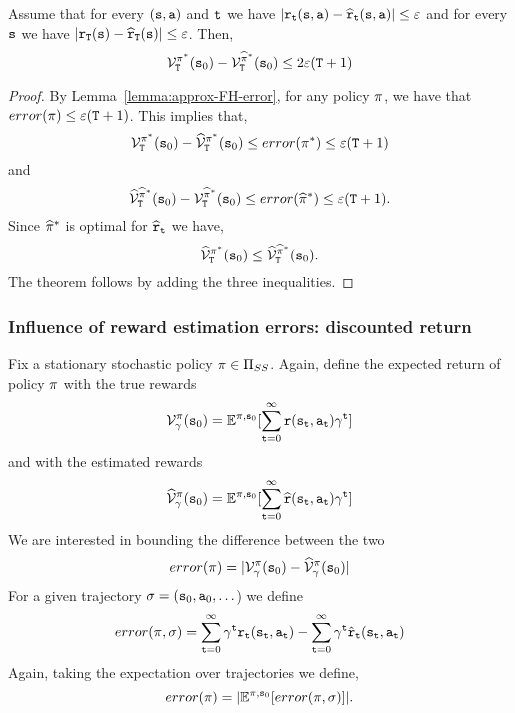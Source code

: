 \begin{theorem}
Assume that for every $({\tt s},{\tt a})$ and ${\tt t}$ we have
$|{\tt r}_{\tt t}({\tt s},{\tt a})-\widehat{{\tt r}}_{\tt t}({\tt s},{\tt a})|\leq
\varepsilon$ and for every ${\tt s}$ we have
$|{\tt r}_{\tt T}({\tt s})-\widehat{{\tt r}}_{\tt T}({\tt s})|\leq\varepsilon$.
Then,
\[
\mathcal{V}^{\pi^*}_{\tt T}({\tt s}_0) -
\mathcal{V}^{\widehat{\pi}^*}_{\tt T} ({\tt s}_0) \leq
2\varepsilon({\tt T}+1)
\]
\end{theorem}

\begin{proof}
By Lemma~\ref{lemma:approx-FH-error},  for any policy $\pi$, we
have that $error(\pi)\leq \varepsilon({\tt T}+1)$. This
implies that,
\[
\mathcal{V}^{\pi^*}_{\tt T}({\tt s}_0)-
\widehat{\mathcal{V}}^{\pi^*}_{\tt T}({\tt s}_0)\leq
error(\pi^*)\leq \varepsilon({\tt T}+1)
\]
and
\[
\widehat{\mathcal{V}}^{\widehat{\pi}^*}_{\tt T}({\tt s}_0)-
\mathcal{V}^{\widehat{\pi}^*}_{\tt T}({\tt s}_0)\leq
error(\widehat{\pi}^*)\leq \varepsilon({\tt T}+1) .
\]
Since $\widehat{\pi}^*$ is optimal for
$\widehat{{\tt r}}_{\tt t}$ we have,
\[
\widehat{\mathcal{V}}^{\pi^*}_{\tt T}({\tt s}_0)\leq
\widehat{\mathcal{V}}^{\widehat{\pi}^*}_{\tt T}({\tt s}_0) .
\]
The theorem follows by adding the three inequalities.
\end{proof}


\subsubsection{Influence of reward estimation errors: discounted return}

Fix a stationary stochastic policy $\pi\in {\Pi _{SS}}$.
Again, define the expected return of policy $\pi$ with the true
rewards
\[
\mathcal{V}^\pi_\gamma({\tt s}_0)=\mathbb{E}^{\pi,{\tt s}_0}[\sum_{{\tt t}=0}^\infty
{\tt r}({\tt s}_{\tt t},{\tt a}_{\tt t})\gamma^{\tt t}]
\]
and with the estimated rewards
\[
\widehat{\mathcal{V}}^\pi_\gamma({\tt s}_0)=\mathbb{E}^{\pi,{\tt s}_0}[\sum_{{\tt t}=0}^\infty
\widehat{{\tt r}}({\tt s}_{\tt t},{\tt a}_{\tt t})\gamma^{\tt t} ]
\]
We are interested in bounding the difference between the two
\[
error(\pi)=|\mathcal{V}^\pi_\gamma({\tt s}_0)-\widehat{\mathcal{V}}^\pi_\gamma({\tt s}_0)|
\]
For a given trajectory
$\sigma=({\tt s}_0,{\tt a}_0,\ldots$)
we define
\[
error(\pi,\sigma)= \sum_{{\tt t}=0}^\infty \gamma^{\tt t}
{\tt r}_{\tt t}({\tt s}_{\tt t},{\tt a}_{\tt t})- \sum_{{\tt t}=0}^\infty
\gamma^{\tt t} \hat{{\tt r}}_{\tt t}({\tt s}_{\tt t},{\tt a}_{\tt t})
\]
Again, taking the expectation over trajectories we define,
\[
error(\pi)=|\mathbb{E}^{\pi,{\tt s}_0} [error(\pi,\sigma)]|.
\]

